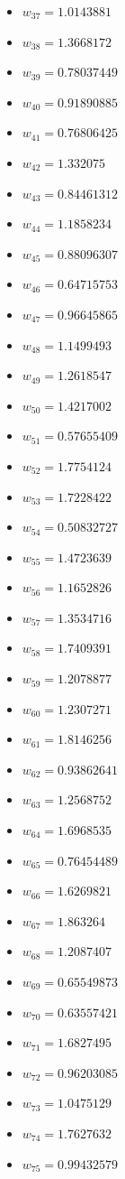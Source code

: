 \documentclass[11pt]{article}
\begin{document}
\begin{itemize}
\item $w_{37} = 1.0143881$
\item $w_{38} = 1.3668172$
\item $w_{39} = 0.78037449$
\item $w_{40} = 0.91890885$
\item $w_{41} = 0.76806425$
\item $w_{42} = 1.332075$
\item $w_{43} = 0.84461312$
\item $w_{44} = 1.1858234$
\item $w_{45} = 0.88096307$
\item $w_{46} = 0.64715753$
\item $w_{47} = 0.96645865$
\item $w_{48} = 1.1499493$
\item $w_{49} = 1.2618547$
\item $w_{50} = 1.4217002$
\item $w_{51} = 0.57655409$
\item $w_{52} = 1.7754124$
\item $w_{53} = 1.7228422$
\item $w_{54} = 0.50832727$
\item $w_{55} = 1.4723639$
\item $w_{56} = 1.1652826$
\item $w_{57} = 1.3534716$
\item $w_{58} = 1.7409391$
\item $w_{59} = 1.2078877$
\item $w_{60} = 1.2307271$
\item $w_{61} = 1.8146256$
\item $w_{62} = 0.93862641$
\item $w_{63} = 1.2568752$
\item $w_{64} = 1.6968535$
\item $w_{65} = 0.76454489$
\item $w_{66} = 1.6269821$
\item $w_{67} = 1.863264$
\item $w_{68} = 1.2087407$
\item $w_{69} = 0.65549873$
\item $w_{70} = 0.63557421$
\item $w_{71} = 1.6827495$
\item $w_{72} = 0.96203085$
\item $w_{73} = 1.0475129$
\item $w_{74} = 1.7627632$
\item $w_{75} = 0.99432579$

\end{itemize}
\end{document}
